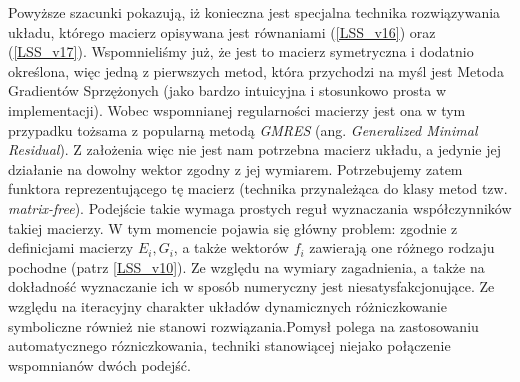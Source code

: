 \documentclass[12pt]{article}
\begin{document}
Powyższe szacunki pokazują, iż konieczna jest specjalna technika rozwiązywania układu, którego macierz opisywana jest równaniami (\ref{LSS_v16}) oraz (\ref{LSS_v17}). Wspomnieliśmy już, że jest to macierz symetryczna i dodatnio określona, więc jedną z pierwszych metod, która przychodzi na myśl jest Metoda Gradientów Sprzężonych (jako bardzo intuicyjna i stosunkowo prosta w implementacji). Wobec wspomnianej regularności macierzy jest ona w tym przypadku tożsama z popularną metodą \textit{GMRES} (ang. \textit{Generalized Minimal Residual}). Z założenia więc nie jest nam potrzebna macierz układu, a jedynie jej działanie na dowolny wektor zgodny z jej wymiarem. Potrzebujemy zatem funktora reprezentującego tę macierz (technika przynależąca do klasy metod tzw. \textit{matrix-free}).\newline
Podejście takie wymaga prostych reguł wyznaczania współczynników takiej macierzy. W tym momencie pojawia się główny problem: zgodnie z definicjami macierzy $ E_{i}, G_{i} $, a także wektorów $ f_{i} $ zawierają one różnego rodzaju pochodne (patrz \ref{LSS_v10}). Ze względu na wymiary zagadnienia, a także na dokładność wyznaczanie ich w sposób numeryczny jest niesatysfakcjonujące. Ze względu na iteracyjny charakter układów dynamicznych różniczkowanie symboliczne również nie stanowi rozwiązania.\newline Pomysł polega na zastosowaniu automatycznego rózniczkowania, techniki stanowiącej niejako połączenie wspomnianów dwóch podejść. 
\end{document}
